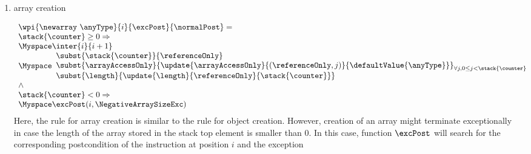 \begin{itemize}
\begin{enumerate}
		
		\item array creation 
	
				 $$\begin{array}{l}
                                         \wpi{\newarray  \ \anyType } {i} {\excPost}{\normalPost}  =  \\
					 \stack{\counter} \ge 0 \Rightarrow  \\
						\Myspace  \inter{i}{i+1} \\
                                                 \Myspace \begin{array}{l}        
						        \subst{\stack{\counter} }{ \referenceOnly } \\
							\subst{ \arrayAccessOnly }{ \update{\arrayAccessOnly}
                                                                                           {(\referenceOnly, j ) }
                                                                                         {\defaultValue{\anyType} } }_{ { \small \forall j , 0 \leq  j < \stack{\counter} } } \\
                                                          \subst{\length}{\update{\length}{\referenceOnly}{\stack{\counter} } }     
						   \end{array} \\
							\wedge \\
						\stack{\counter} < 0 \Rightarrow  \\
								\Myspace  \excPost( i, \NegativeArraySizeExc) \\
                                    \end{array} $$
		  Here, the rule for array creation is similar to the rule for object creation.
		  However, creation of an array might terminate exceptionally in case the length of the array stored 
		  in the stack top element \stack{\counter} is smaller than $0$. In this case, function $\excPost$ will search for the corresponding postcondition 
		  of the instruction at position $i$ and the exception \NegativeArraySizeExc
		

\end{enumerate}
\end{itemize}
